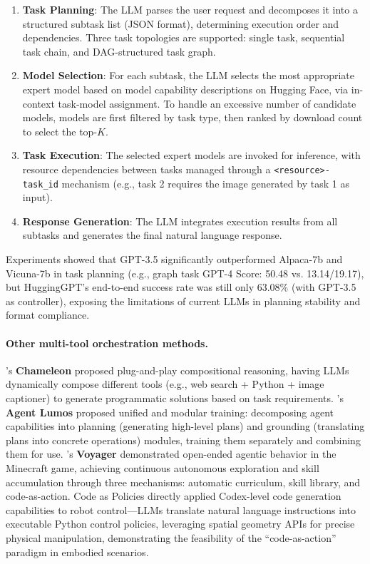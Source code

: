 \begin{enumerate}[leftmargin=*]
  \item \textbf{Task Planning}: The LLM parses the user request and decomposes it into a structured subtask list (JSON format), determining execution order and dependencies. Three task topologies are supported: single task, sequential task chain, and DAG-structured task graph.
  \item \textbf{Model Selection}: For each subtask, the LLM selects the most appropriate expert model based on model capability descriptions on Hugging Face, via in-context task-model assignment. To handle an excessive number of candidate models, models are first filtered by task type, then ranked by download count to select the top-$K$.
  \item \textbf{Task Execution}: The selected expert models are invoked for inference, with resource dependencies between tasks managed through a \texttt{<resource>-task\_id} mechanism (e.g., task 2 requires the image generated by task 1 as input).
  \item \textbf{Response Generation}: The LLM integrates execution results from all subtasks and generates the final natural language response.
\end{enumerate}

Experiments showed that GPT-3.5 significantly outperformed Alpaca-7b and Vicuna-7b in task planning (e.g., graph task GPT-4 Score: 50.48 vs. 13.14/19.17), but HuggingGPT's end-to-end success rate was still only 63.08\% (with GPT-3.5 as controller), exposing the limitations of current LLMs in planning stability and format compliance.

\paragraph{Other multi-tool orchestration methods.}
\citet{lu2023chameleon}'s \textbf{Chameleon} proposed plug-and-play compositional reasoning, having LLMs dynamically compose different tools (e.g., web search + Python + image captioner) to generate programmatic solutions based on task requirements.
\citet{yin2023agentlumos}'s \textbf{Agent Lumos} proposed unified and modular training: decomposing agent capabilities into planning (generating high-level plans) and grounding (translating plans into concrete operations) modules, training them separately and combining them for use.
\citet{wang2023voyager}'s \textbf{Voyager} demonstrated open-ended agentic behavior in the Minecraft game, achieving continuous autonomous exploration and skill accumulation through three mechanisms: automatic curriculum, skill library, and code-as-action.
Code as Policies \cite{liang2023codepolicies} directly applied Codex-level code generation capabilities
to robot control---LLMs translate natural language instructions into executable Python control policies,
leveraging spatial geometry APIs for precise physical manipulation,
demonstrating the feasibility of the ``code-as-action'' paradigm in embodied scenarios.

